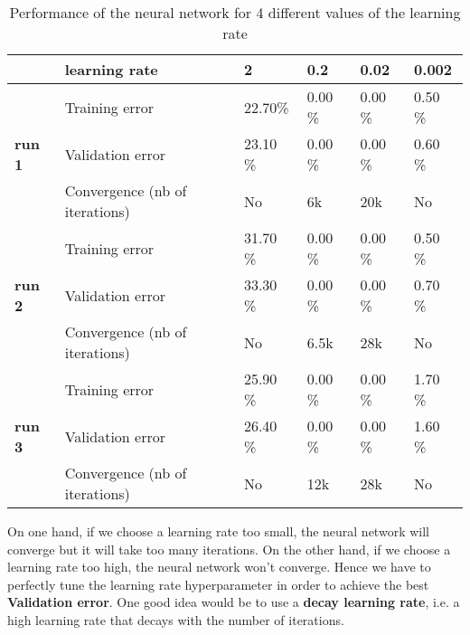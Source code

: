 \documentclass{article}
\begin{document}
\begin{table}[H]
\centering
\bgroup
\def\arraystretch{1.5}
\begin{tabular}{|l|l|l|l|l|l|}
\hline
 & \textbf{learning rate} & 2 & \textbf{0.2} & 0.02 & 0.002 \\ \hline
\multirow{3}{*}{\textbf{run 1}} & Training error & 22.70\% & 0.00 \% & 0.00 \% & 0.50 \% \\ \cline{2-6} 
 & Validation error & 23.10 \% & 0.00 \% & 0.00 \% & 0.60 \% \\ \cline{2-6} 
 & Convergence (nb of iterations) & No & 6k & 20k & No \\ \hline
\multirow{3}{*}{\textbf{run 2}} & Training error & 31.70 \% & 0.00 \% & 0.00 \% & 0.50 \% \\ \cline{2-6} 
 & Validation error & 33.30 \% & 0.00 \% & 0.00 \% & 0.70 \% \\ \cline{2-6} 
 & Convergence (nb of iterations) & No & 6.5k & 28k & No \\ \hline
\multirow{3}{*}{\textbf{run 3}} & Training error & 25.90 \% & 0.00 \% & 0.00 \% & 1.70 \% \\ \cline{2-6} 
 & Validation error & 26.40 \% & 0.00 \% & 0.00 \% & 1.60 \% \\ \cline{2-6} 
 & Convergence (nb of iterations) & No & 12k & 28k & No \\ \hline
\end{tabular}
\egroup
\caption{Performance of the neural network for 4 different values of the learning rate}
\label{table:lr_perf}
\end{table}

On one hand, if we choose a learning rate too small, the neural network will converge but it will take too many iterations. On the other
hand, if we choose a learning rate too high, the neural network won't converge. Hence we have to perfectly tune the learning rate hyperparameter
in order to achieve the best \textbf{Validation error}. One good idea would be to use a \textbf{decay learning rate}, i.e. a high learning rate that decays with
the number of iterations.


\end{document}
